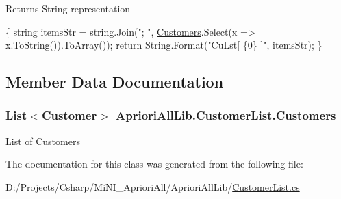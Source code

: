 \begin{DoxyReturn}{Returns}
String representation
\end{DoxyReturn}

\begin{DoxyCode}
                                          \{
            \textcolor{keywordtype}{string} itemsStr = \textcolor{keywordtype}{string}.Join(\textcolor{stringliteral}{"; "}, \hyperlink{class_apriori_all_lib_1_1_customer_list_a4fd2a16a984844e61ffc60b327e6534a}{Customers}.Select(x => 
      x.ToString()).ToArray());
            \textcolor{keywordflow}{return} String.Format(\textcolor{stringliteral}{"CuLst[ \{0\} ]"}, itemsStr);
        \}
\end{DoxyCode}


\subsection{Member Data Documentation}
\hypertarget{class_apriori_all_lib_1_1_customer_list_a4fd2a16a984844e61ffc60b327e6534a}{
\subsubsection[{Customers}]{\setlength{\rightskip}{0pt plus 5cm}List$<${\bf Customer}$>$ Apriori\-All\-Lib.\-Customer\-List.\-Customers}}\label{class_apriori_all_lib_1_1_customer_list_a4fd2a16a984844e61ffc60b327e6534a}


List of Customers 



The documentation for this class was generated from the following file\-:\begin{DoxyCompactItemize}
\item 
D\-:/\-Projects/\-Csharp/\-Mi\-N\-I\-\_\-\-Apriori\-All/\-Apriori\-All\-Lib/\hyperlink{_customer_list_8cs}{Customer\-List.\-cs}\end{DoxyCompactItemize}

